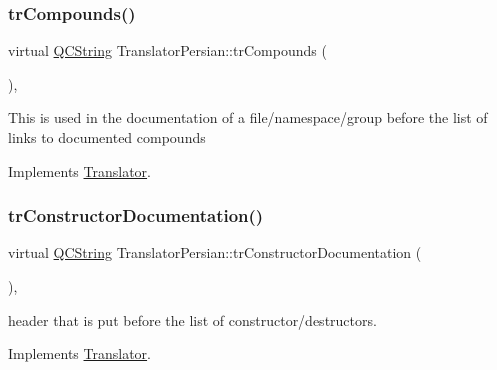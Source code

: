 \mbox{\label{class_translator_persian_a2415f824b684e8411944fe033350aaa0}} 
\subsubsection{\texorpdfstring{trCompounds()}{trCompounds()}}
{\footnotesize\ttfamily virtual \mbox{\hyperlink{class_q_c_string}{Q\+C\+String}} Translator\+Persian\+::tr\+Compounds (\begin{DoxyParamCaption}{ }\end{DoxyParamCaption})\hspace{0.3cm}{\ttfamily [inline]}, {\ttfamily [virtual]}}

This is used in the documentation of a file/namespace/group before the list of links to documented compounds 

Implements \mbox{\hyperlink{class_translator}{Translator}}.

\mbox{\label{class_translator_persian_aa79e5feb5a3700ab483130fc027f194a}} 
\subsubsection{\texorpdfstring{trConstructorDocumentation()}{trConstructorDocumentation()}}
{\footnotesize\ttfamily virtual \mbox{\hyperlink{class_q_c_string}{Q\+C\+String}} Translator\+Persian\+::tr\+Constructor\+Documentation (\begin{DoxyParamCaption}{ }\end{DoxyParamCaption})\hspace{0.3cm}{\ttfamily [inline]}, {\ttfamily [virtual]}}

header that is put before the list of constructor/destructors. 

Implements \mbox{\hyperlink{class_translator}{Translator}}.

\mbox{\label{class_translator_persian_aa2e3546529d921587ea817b48e1a9604}} 
